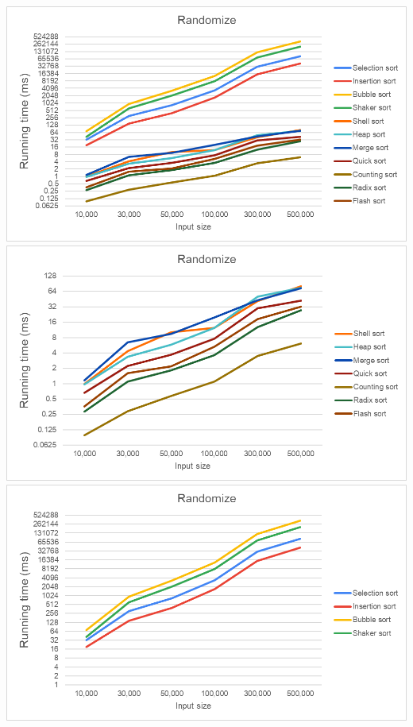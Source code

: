     \includegraphics[width = 1\linewidth]{img/experiment/running time/randomized/1.png}
    \includegraphics[width = 1\linewidth]{img/experiment/running time/randomized/2.png}
    \includegraphics[width = 1\linewidth]{img/experiment/running time/randomized/3.png}

